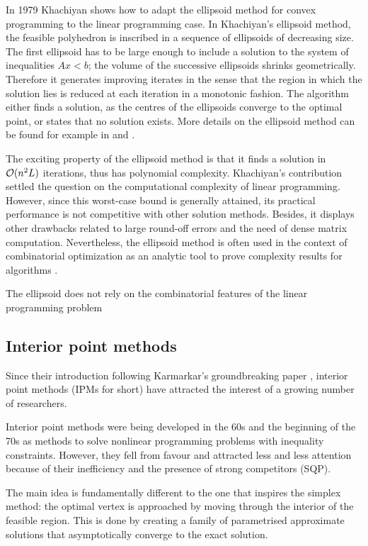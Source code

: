In 1979 Khachiyan shows how to adapt the ellipsoid method for convex
programming to the linear programming case.
In Khachiyan's ellipsoid method, the feasible polyhedron is inscribed in 
a sequence of ellipsoids of decreasing size. 
The first ellipsoid has to be large enough to include a solution to the
system of inequalities $Ax < b$; the volume of the successive ellipsoids 
shrinks geometrically. Therefore it generates improving iterates
in the sense that the region in which the solution lies is 
reduced at each iteration in a monotonic fashion.
The algorithm either finds a solution, as the centres of the ellipsoids
converge to the optimal point, or states that no solution exists.
More details on the ellipsoid method can be found for example in 
\cite[ch.~13]{Schrijver86} and \cite[ch.~I.6]{ip:NemhauserWolsey88}.

The exciting property of the ellipsoid method is that it finds a 
solution in $\mathcal{O}(n^2L)$ iterations, thus has polynomial complexity. 
Khachiyan's contribution settled the question on the computational 
complexity of linear programming.
However, since this worst-case bound
is generally attained, its practical performance is not competitive
with other solution methods. Besides, it displays other drawbacks
related to large round-off errors and the need of dense matrix computation.
Nevertheless, the ellipsoid method is often used in the context of
combinatorial optimization as an analytic tool to prove complexity
results for algorithms \cite{ip:NemhauserWolsey88}.

The ellipsoid does not rely on the combinatorial features of the
linear programming problem

%
%
\subsection{Interior point methods}

Since their introduction following Karmarkar's groundbreaking paper
\cite{Karmarkar}, interior point methods (IPMs for short) have attracted 
the interest of a growing number of researchers.

Interior point methods were being developed in the 60s and the beginning
of the 70s as methods to solve nonlinear programming problems with
inequality constraints. 
However, they fell from favour and attracted less and less attention
because of their inefficiency and the presence of strong competitors
(SQP).

The main idea is fundamentally different to the one that inspires the
simplex method: the optimal vertex is approached by moving through the
interior of the feasible region.
This is done by creating a family of parametrised approximate solutions
that asymptotically converge to the exact solution.

